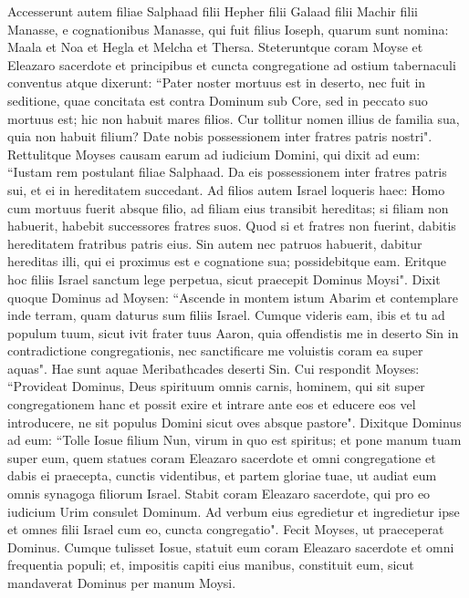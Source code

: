 \begin{biblechapter}  
\verse Accesserunt autem filiae Salphaad filii Hepher filii Galaad filii Machir filii Manasse, e cognationibus Manasse, qui fuit filius Ioseph, quarum sunt nomina: Maala et Noa et Hegla et Melcha et Thersa. 
\verse Steteruntque coram Moyse et Eleazaro sacerdote et principibus et cuncta congregatione ad ostium tabernaculi conventus atque dixerunt: 
\verse “Pater noster mortuus est in deserto, nec fuit in seditione, quae concitata est contra Dominum sub Core, sed in peccato suo mortuus est; hic non habuit mares filios. 
\verse Cur tollitur nomen illius de familia sua, quia non habuit filium? Date nobis possessionem inter fratres patris nostri". 
\verse Rettulitque Moyses causam earum ad iudicium Domini, 
\verse qui dixit ad eum:  
\verse “Iustam rem postulant filiae Salphaad. Da eis possessionem inter fratres patris sui, et ei in hereditatem succedant. 
\verse Ad filios autem Israel loqueris haec: Homo cum mortuus fuerit absque filio, ad filiam eius transibit hereditas; 
\verse si filiam non habuerit, habebit successores fratres suos.  
\verse Quod si et fratres non fuerint, dabitis hereditatem fratribus patris eius.  
\verse Sin autem nec patruos habuerit, dabitur hereditas illi, qui ei proximus est e cognatione sua; possidebitque eam. Eritque hoc filiis Israel sanctum lege perpetua, sicut praecepit Dominus Moysi". 
\verse Dixit quoque Dominus ad Moysen: “Ascende in montem istum Abarim et contemplare inde terram, quam daturus sum filiis Israel. 
\verse Cumque videris eam, ibis et tu ad populum tuum, sicut ivit frater tuus Aaron, 
\verse quia offendistis me in deserto Sin in contradictione congregationis, nec sanctificare me voluistis coram ea super aquas". Hae sunt aquae Meribathcades deserti Sin. 
\verse Cui respondit Moyses: 
\verse “Provideat Dominus, Deus spirituum omnis carnis, hominem, qui sit super congregationem hanc 
\verse et possit exire et intrare ante eos et educere eos vel introducere, ne sit populus Domini sicut oves absque pastore". 
\verse Dixitque Dominus ad eum: “Tolle Iosue filium Nun, virum in quo est spiritus; et pone manum tuam super eum, 
\verse quem statues coram Eleazaro sacerdote et omni congregatione et dabis ei praecepta, cunctis videntibus, 
\verse et partem gloriae tuae, ut audiat eum omnis synagoga filiorum Israel. 
\verse Stabit coram Eleazaro sacerdote, qui pro eo iudicium Urim consulet Dominum. Ad verbum eius egredietur et ingredietur ipse et omnes filii Israel cum eo, cuncta congregatio". 
\verse Fecit Moyses, ut praeceperat Dominus. Cumque tulisset Iosue, statuit eum coram Eleazaro sacerdote et omni frequentia populi; 
\verse et, impositis capiti eius manibus, constituit eum, sicut mandaverat Dominus per manum Moysi. 
\end{biblechapter}

